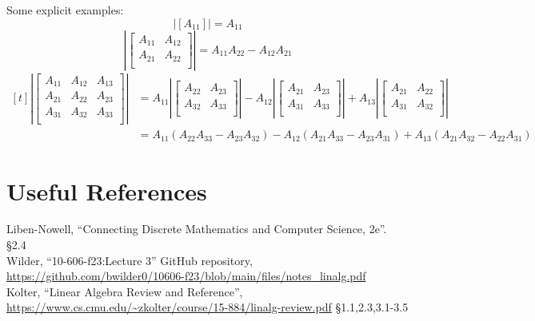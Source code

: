 Some explicit examples:
\[\left|\left[A_{11}\right]\right| = A_{11}\]
\[\left|\left[\begin{matrix}A_{11} & A_{12}\\ A_{21} & A_{22}\\\end{matrix}\right]\right| = A_{11}A_{22}-A_{12}A_{21}\]
\[
\begin{aligned}[t]
\left|\left[\begin{matrix}A_{11} & A_{12} & A_{13}\\ A_{21} & A_{22} & A_{23}\\ A_{31} & A_{32} & A_{33}\\\end{matrix}\right]\right| 
& = A_{11}\left|\left[\begin{matrix}A_{22} & A_{23}\\ A_{32} & A_{33}\\\end{matrix}\right]\right|-A_{12}\left|\left[\begin{matrix}A_{21} & A_{23}\\ A_{31} & A_{33}\\\end{matrix}\right]\right|+A_{13}\left|\left[\begin{matrix}A_{21} & A_{22}\\ A_{31} & A_{32}\\\end{matrix}\right]\right| \\
& = A_{11}\left(A_{22}A_{33}-A_{23}A_{32}\right)-A_{12}\left(A_{21}A_{33}-A_{23}A_{31}\right)+A_{13}\left(A_{21}A_{32}-A_{22}A_{31}\right) \end{aligned}\]


\section*{Useful References}
Liben-Nowell, ``Connecting Discrete Mathematics and Computer Science, 2e''. \S 2.4\\
Wilder, ``10-606-f23:Lecture 3'' GitHub repository, \url{https://github.com/bwilder0/10606-f23/blob/main/files/notes_linalg.pdf}\\
Kolter, ``Linear Algebra Review and Reference'', \url{https://www.cs.cmu.edu/~zkolter/course/15-884/linalg-review.pdf} \S1.1,2.3,3.1-3.5

